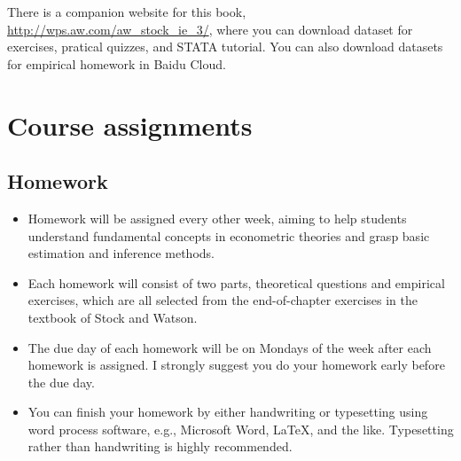 \documentclass[a4paper,11pt]{article}
\begin{document}
There is a companion website for this book,
\url{http://wps.aw.com/aw\_stock\_ie\_3/}, where you can download dataset for
exercises, pratical quizzes, and STATA tutorial. You can also download
datasets for empirical homework in Baidu Cloud.


\section{Course assignments}
\label{sec:orgdaf282f}
\subsection*{Homework}
\label{sec:orgd790eb6}

\begin{itemize}
\item Homework will be assigned every other week, aiming to help students
understand fundamental concepts in econometric theories and grasp
basic estimation and inference methods.

\item Each homework will consist of two parts, theoretical questions and
empirical exercises, which are all selected from the end-of-chapter
exercises in the textbook of Stock and Watson.

\item The due day of each homework will be on Mondays of the week after
each homework is assigned. I strongly suggest you do your homework
early before the due day.

\item You can finish your homework by either handwriting or typesetting
using word process software, e.g., Microsoft Word, \LaTeX{}, and the
like. Typesetting rather than handwriting is highly recommended.


\end{itemize}
\end{document}
